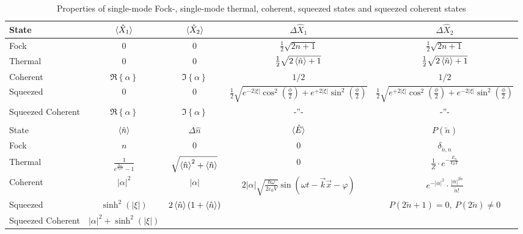 \documentclass{article}
\newcommand{\lr}[1]{\left(#1\right)}
\newcommand{\lrschweif}[1]{\left\{#1\right\}}
\begin{document}
\begin{landscape}
\begin{table}[h]
	\centering
	\caption{Properties of single-mode Fock-, single-mode thermal, coherent, squeezed states and squeezed coherent states}
	\begin{tabular}{p{1.5cm}|c|c|c|c}
		\hline\hline
			State & $\braket{\hat{X}_1}$ & $\braket{\hat{X}_2}$ & $\Delta\hat{X}_1$ & $\Delta\hat{X}_2$ \\
		\hline\hline
			Fock & $0$ & $0$ & $\frac{1}{2}\sqrt{2n+1}$ & $\frac{1}{2}\sqrt{2n+1}$ \\
		\hline
			Thermal & $0$ & $0$ & $\frac{1}{2}\sqrt{2\braket{\hat{n}}+1}$ & $\frac{1}{2}\sqrt{2\braket{\hat{n}}+1}$ \\
		\hline
			Coherent & $\Re\lrschweif{\alpha}$ & $\Im\lrschweif{\alpha}$ & $1/2$ & $1/2$ \\
		\hline
			Squeezed & $0$ & $0$ & $\frac{1}{2} \sqrt{  e^{-2|\xi|} \cos^2( \frac{\phi}{2} ) + e^{+2|\xi|} \sin^2( \frac{\phi}{2} ) }$ & $\frac{1}{2} \sqrt{ e^{+2|\xi|} \cos^2( \frac{\phi}{2} ) + e^{-2|\xi|} \sin^2( \frac{\phi}{2} ) }$ \\
		\hline
			Squeezed Coherent & $\Re\lrschweif{\alpha}$ & $\Im\lrschweif{\alpha}$ & -''- & -''- \\
		\hline\hline
		\\
		\hline\hline
			State & $\braket{\hat{n}}$ & $\Delta \hat{n}$ & $\braket{\hat{E}}$ & $P(\tilde{n})$ \\
		\hline\hline
			Fock & $n$ & $0$ & $0$ & $\delta_{\tilde{n},n}$ \\
		\hline
			Thermal & $\frac{1}{ e^{\frac{\hbar\omega}{k_BT}}  - 1 }$ & $\sqrt{ \braket{\hat{n}}^2 + \braket{\hat{n}} }$ & $0$ & $\frac{1}{Z} \cdot e^{-\frac{E_n}{k_B T}}$ \\
		\hline
			Coherent & $|\alpha|^2$ & $|\alpha|$ & $2|\alpha| \sqrt{\frac{\hbar\omega}{2\varepsilon_0 V}} \sin\lr{ \omega t - \vec{k}\vec{x} - \varphi }$ & $e^{-|\alpha|^2} \cdot \frac{|\alpha|^{2\tilde{n}}}{\tilde{n}!}$ \\
		\hline
			Squeezed & $\sinh^2(|\xi|)$ & $2\braket{\hat{n}}( 1 + \braket{\hat{n}} )$ &  & $P(2\tilde{n}+1) = 0,\ P(2\tilde{n}) \neq 0$ \\
		\hline
			Squeezed Coherent & $|\alpha|^2 + \sinh^2(|\xi|)$ &  &  &  \\
		\hline\hline
	\end{tabular}
\end{table}

\end{landscape}
\end{document}
